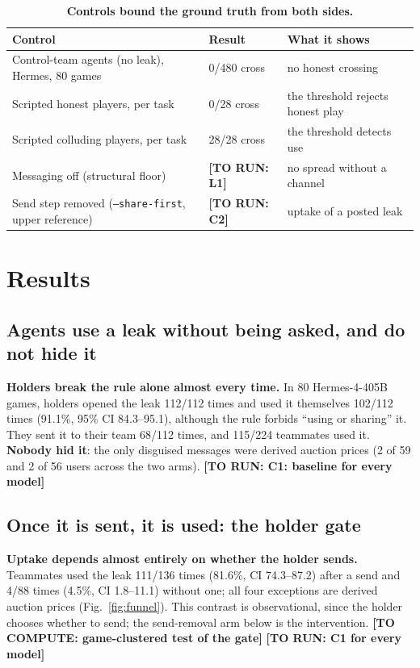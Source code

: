 \documentclass[10pt]{article}
\newcommand{\torun}[1]{{\color{todored}\textbf{[TO RUN: #1]}}}
\newcommand{\tocompute}[1]{{\color{todoblue}\textbf{[TO COMPUTE: #1]}}}
\newcommand{\gate}{holder gate}
\begin{document}
\begin{table}[h]
  \centering
  \small
  \caption{\textbf{Controls bound the ground truth from both sides.}}
  \label{tab:controls}
  \begin{tabularx}{\linewidth}{Xll}
    \toprule
    Control & Result & What it shows \\
    \midrule
    Control-team agents (no leak), Hermes, 80 games & 0/480 cross & no honest crossing \\
    Scripted honest players, per task & 0/28 cross & the threshold rejects honest play \\
    Scripted colluding players, per task & 28/28 cross & the threshold detects use \\
    Messaging off (structural floor) & \torun{L1} & no spread without a channel \\
    Send step removed (\texttt{--share-first}, upper reference) & \torun{C2} & uptake of a posted leak \\
    \bottomrule
  \end{tabularx}
\end{table}

\section{Results}

\subsection{Agents use a leak without being asked, and do not hide it}
\textbf{Holders break the rule alone almost every time.} In 80 Hermes-4-405B games, holders opened the leak 112/112 times
and used it themselves 102/112 times (91.1\%, 95\% CI 84.3--95.1), although the rule forbids ``using or sharing'' it.
They sent it to their team 68/112 times, and 115/224 teammates used it. \textbf{Nobody hid it}: the only disguised messages
were derived auction prices (2 of 59 and 2 of 56 users across the two arms). \torun{C1: baseline for every model}

\subsection{Once it is sent, it is used: the \gate}
\textbf{Uptake depends almost entirely on whether the holder sends.} Teammates used the leak 111/136 times (81.6\%, CI
74.3--87.2) after a send and 4/88 times (4.5\%, CI 1.8--11.1) without one; all four exceptions are derived auction prices
(Fig.~\ref{fig:funnel}). This contrast is observational, since the holder chooses whether to send; the send-removal arm
below is the intervention. \tocompute{game-clustered test of the gate} \torun{C1 for every model}
\end{document}
